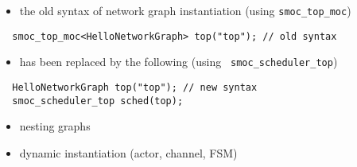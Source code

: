\begin{frame}[fragile=singleslide]
\begin{itemize}
\item the old syntax of network graph instantiation (using \lstinline!smoc_top_moc!)
\end{itemize}
\begin{lstlisting}
  smoc_top_moc<HelloNetworkGraph> top("top"); // old syntax
\end{lstlisting}
\begin{itemize}
\item has been replaced by the following (using \lstinline! smoc_scheduler_top!)
\end{itemize}
\begin{lstlisting}
  HelloNetworkGraph top("top"); // new syntax
  smoc_scheduler_top sched(top);
\end{lstlisting}
\end{frame}





\begin{frame}
\begin{itemize}
\item nesting graphs
\item dynamic instantiation (actor, channel, FSM)

\end{itemize}
\end{frame}


